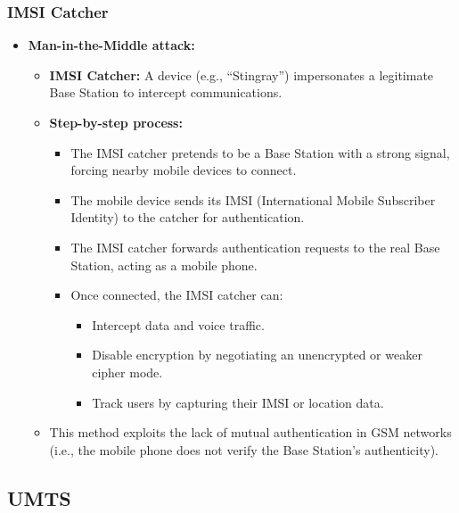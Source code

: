 \subsubsection{IMSI Catcher}
\begin{itemize}
    \item \textbf{Man-in-the-Middle attack:}
    \begin{itemize}
        \item \textbf{IMSI Catcher:} A device (e.g., “Stingray”) impersonates a legitimate Base Station to intercept communications.
        \item \textbf{Step-by-step process:}
        \begin{itemize}
            \item The IMSI catcher pretends to be a Base Station with a strong signal, forcing nearby mobile devices to connect.
            \item The mobile device sends its IMSI (International Mobile Subscriber Identity) to the catcher for authentication.
            \item The IMSI catcher forwards authentication requests to the real Base Station, acting as a mobile phone.
            \item Once connected, the IMSI catcher can:
            \begin{itemize}
                \item Intercept data and voice traffic.
                \item Disable encryption by negotiating an unencrypted or weaker cipher mode.
                \item Track users by capturing their IMSI or location data.
            \end{itemize}
        \end{itemize}
        \item This method exploits the lack of mutual authentication in GSM networks (i.e., the mobile phone does not verify the Base Station's authenticity).
    \end{itemize}
\end{itemize}

\subsection{UMTS}
